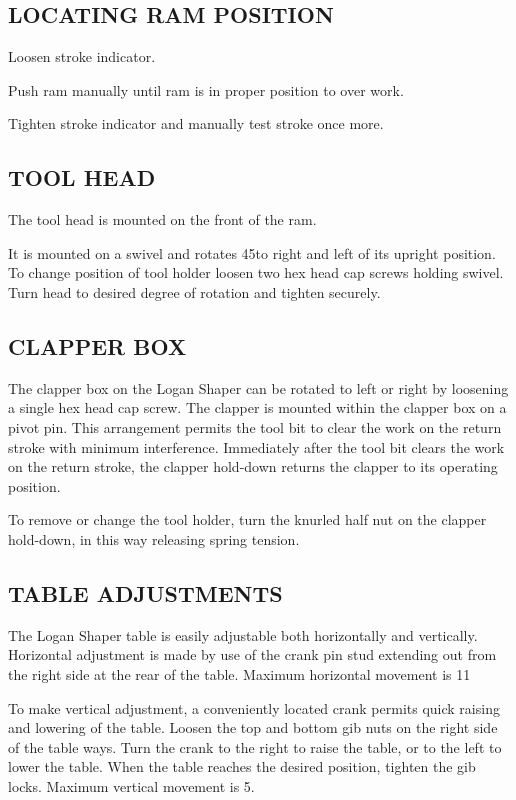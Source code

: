 \documentclass{article}
\begin{document}
\subsection{LOCATING RAM POSITION}

Loosen stroke indicator.

Push ram manually until ram is in proper position to over work.

Tighten stroke indicator and manually test stroke once more.

\subsection{TOOL HEAD}

The tool head is mounted on the front of the ram.

It is mounted on a swivel and rotates 45\degrees to right and left of
its upright position.  To change position of tool holder loosen two
hex head cap screws holding swivel.  Turn head to desired degree of
rotation and tighten securely.

\subsection{CLAPPER BOX}

The clapper box on the Logan Shaper can be rotated to left or right by
loosening a single hex head cap screw.  The clapper is mounted within
the clapper box on a pivot pin.  This arrangement permits the tool bit
to clear the work on the return stroke with minimum interference.
Immediately after the tool bit clears the work on the return stroke,
the clapper hold-down returns the clapper to its operating position.

To remove or change the tool holder, turn the knurled half nut on the
clapper hold-down, in this way releasing spring tension.

\subsection{TABLE ADJUSTMENTS}

The Logan Shaper table is easily adjustable both horizontally and
vertically. Horizontal adjustment is made by use of the crank pin stud
extending out from the right side at the rear of the table.  Maximum
horizontal movement is 11\half\inch

To make vertical adjustment, a conveniently located crank permits
quick raising and lowering of the table.  Loosen the top and bottom
gib nuts on the right side of the table ways.  Turn the crank to the
right to raise the table, or to the left to lower the table.  When the
table reaches the desired position, tighten the gib locks.  Maximum
vertical movement is 5\half\inch.
\end{document}
